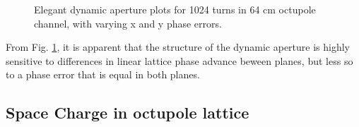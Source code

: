 \begin{figure}

\caption{Elegant dynamic aperture plots for 1024 turns in 64 cm octupole channel, with varying x and y phase errors.} \label{fig:phase-error-xy}
\end{figure}


From Fig. \ref{fig:phase-error-xy}, it is apparent that the structure of the dynamic aperture is highly sensitive to differences in linear lattice phase advance beween planes, but less so to a phase error that is equal in both planes. 



\subsection{Space Charge in octupole lattice}


